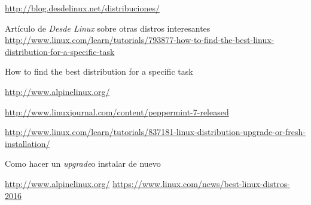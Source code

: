 \documentclass[a4paper]{article}
\begin{document}
\begin{thebibliography}{99}
	 \url{http://blog.desdelinux.net/distribuciones/}
		
		{Artículo de \textit{Desde Linux} sobre otras distros interesantes}
	 \url{http://www.linux.com/learn/tutorials/793877-how-to-find-the-best-linux-distribution-for-a-specific-task}

		{How to find the best distribution for a specific task}

	 \url{http://www.alpinelinux.org/}

	\url{http://www.linuxjournal.com/content/peppermint-7-released}

	 \url{http://www.linux.com/learn/tutorials/837181-linux-distribution-upgrade-or-fresh-installation/}

		{Como hacer un \textit{upgrade}o instalar de nuevo}

	 \url{http://www.alpinelinux.org/}
	\url{https://www.linux.com/news/best-linux-distros-2016}
\end{thebibliography}
\end{document}
